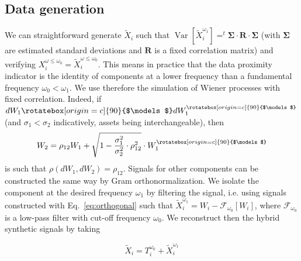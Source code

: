 \documentclass{article}
\DeclareMathOperator{\Var}{Var}
\newcommand{\Varb}[1]{\ensuremath{\Var\!\left[#1\right]}}
\newcommand{\indep}{\rotatebox[origin=c]{90}{$\models$}}
\begin{document}
\subsection*{Data generation}


We can straightforward generate $\tilde{X}_i$ such that $\Varb{\tilde{X}_i^{\omega_1}}= ^{t}\mathbf{\Sigma} \cdot \mathbf{R} \cdot \mathbf{\Sigma}$ (with $\mathbf{\Sigma}$ are estimated standard deviations and $\mathbf{R}$ is a fixed correlation matrix) and verifying $X_i^{\omega \leq \omega_0} = \tilde{X}_i^{\omega \leq \omega_0}$. This means in practice that the data proximity indicator is the identity of components at a lower frequency than a fundamental frequency $\omega_0 < \omega_1$. We use therefore the simulation of Wiener processes with fixed correlation. Indeed, if $dW_1 \indep dW_1^{\indep}$ (and $\sigma_1 < \sigma_2$ indicatively, assets being interchangeable), then
\begin{equation}
\label{eq:orthogonal}
W_2 = \rho_{12}W_1 + \sqrt{1-\frac{\sigma_1^2}{\sigma_2^2}\cdot\rho_{12}^2}\cdot W_1^{\indep}
\end{equation}
is such that $\rho(dW_1,dW_2)=\rho_{12}$. Signals for other components can be constructed the same way by Gram orthonormalization. We isolate the component at the desired frequency $\omega_1$ by filtering the signal, i.e. using signals constructed with Eq.~\ref{eq:orthogonal} such that $\tilde{X}_i^{\omega_1} = W_i - \mathcal{F}_{\omega_0}[W_i]$, where $\mathcal{F}_{\omega_0}$ is a low-pass filter with cut-off frequency $\omega_0$. We reconstruct then the hybrid synthetic signals by taking
 
\begin{equation}
\tilde{X}_i = T_i^{\omega_0} + \tilde{X}_i^{\omega_1}
\end{equation}
\end{document}
